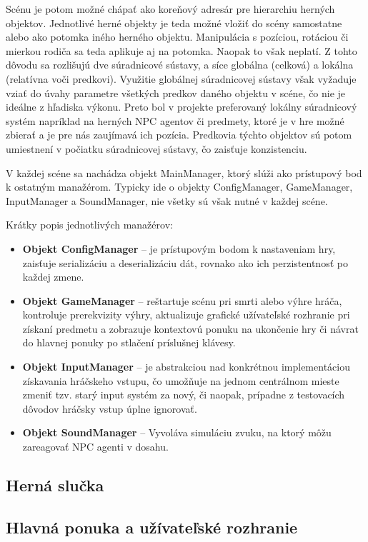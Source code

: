 \documentclass[slovak, master]{diploma}
\begin{document}
Scénu je potom možné chápať ako koreňový adresár pre hierarchiu herných objektov. Jednotlivé herné objekty je teda možné vložiť do scény samostatne alebo ako potomka iného herného objektu. Manipulácia s pozíciou, rotáciou či mierkou rodiča sa teda aplikuje aj na potomka. Naopak to však neplatí. Z tohto dôvodu sa rozlišujú dve súradnicové sústavy, a síce globálna (celková) a lokálna (relatívna voči predkovi). Využitie globálnej súradnicovej sústavy však vyžaduje vziať do úvahy parametre všetkých predkov daného objektu v scéne, čo nie je ideálne z hľadiska výkonu. Preto bol v projekte preferovaný lokálny súradnicový systém napríklad na herných NPC agentov či predmety, ktoré je v hre možné zbierať a je pre nás zaujímavá ich pozícia. Predkovia týchto objektov sú potom umiestnení v počiatku súradnicovej sústavy, čo zaisťuje konzistenciu.

V každej scéne sa nachádza objekt MainManager, ktorý slúži ako prístupový bod k ostatným manažérom. Typicky ide o objekty ConfigManager, GameManager, InputManager a SoundManager, nie všetky sú však nutné v každej scéne. 

Krátky popis jednotlivých manažérov:
\begin{itemize}
  \item \textbf{Objekt ConfigManager} -- je prístupovým bodom k nastaveniam hry, zaisťuje serializáciu a deserializáciu dát, rovnako ako ich perzistentnosť po každej zmene.
  \item \textbf{Objekt GameManager} -- reštartuje scénu pri smrti alebo výhre hráča, kontroluje prerekvizity výhry, aktualizuje grafické užívateľské rozhranie pri získaní predmetu a zobrazuje kontextovú ponuku na ukončenie hry či návrat do hlavnej ponuky po stlačení príslušnej klávesy.
  \item \textbf{Objekt InputManager} -- je abstrakciou nad konkrétnou implementáciou získavania hráčskeho vstupu, čo umožňuje na jednom centrálnom mieste zmeniť tzv. starý input systém za nový, či naopak, prípadne z testovacích dôvodov hráčsky vstup úplne ignorovať. 
  \item \textbf{Objekt SoundManager} -- Vyvoláva simuláciu zvuku, na ktorý môžu zareagovať NPC agenti v dosahu.
\end{itemize}

\subsection{Herná slučka}
\label{sec:GameLoop}
\subsection{Hlavná ponuka a užívateľské rozhranie}
\label{sec:MainMenuAndUI}
\end{document}
